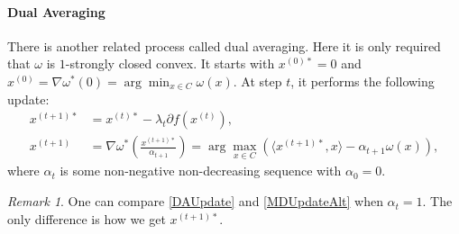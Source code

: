 \documentclass[openany]{book}
\theoremstyle{definition}
\theoremstyle{remark}
\newtheorem*{remark}{Remark}
\begin{document}
\paragraph{Dual Averaging}
There is another related process called dual averaging. Here it is only required that $\omega$ is $1$-strongly closed convex. It starts with $x^{(0)*}=0$ and $x^{(0)}=\nabla\omega^*(0)=\arg\min_{x\in C}\omega(x)$. At step $t$, it performs the following update:
\begin{equation}\label{DAUpdate}
    \begin{split}
        x^{(t+1)*} & =x^{(t)*}-\lambda_t\partial f(x^{(t)}), \\
        x^{(t+1)} & =\nabla\omega^*\left(\frac{x^{(t+1)*}}{\alpha_{t+1}}\right)=\arg\max_{x\in C}\left(\langle x^{(t+1)*},x\rangle-\alpha_{t+1}\omega(x)\right),
    \end{split}
\end{equation}
where $\alpha_t$ is some non-negative non-decreasing sequence with $\alpha_0=0$.
\begin{remark}
    One can compare \eqref{DAUpdate} and \eqref{MDUpdateAlt} when $\alpha_t=1$. The only difference is how we get $x^{(t+1)*}$.
\end{remark}
\end{document}
